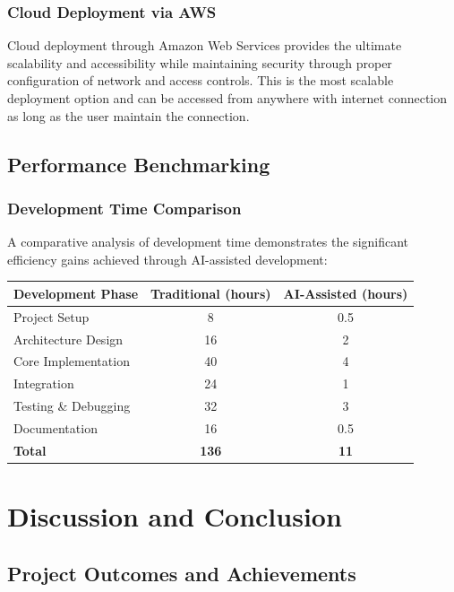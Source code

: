 \documentclass[12pt,letterpaper]{article}
\begin{document}
\subsubsection{Cloud Deployment via AWS}

Cloud deployment through Amazon Web Services provides the ultimate scalability and accessibility while maintaining security through proper configuration of network and access controls.
This is the most scalable deployment option and can be accessed from anywhere with internet connection as long as the user maintain the connection.

\subsection{Performance Benchmarking}

\subsubsection{Development Time Comparison}

A comparative analysis of development time demonstrates the significant efficiency gains achieved through AI-assisted development:

\begin{center}
\begin{tabular}{|l|c|c|}
\hline
\textbf{Development Phase} & \textbf{Traditional (hours)} & \textbf{AI-Assisted (hours)} \\
\hline
Project Setup & 8 & 0.5 \\
Architecture Design & 16 & 2 \\
Core Implementation & 40 & 4 \\
Integration & 24 & 1 \\
Testing \& Debugging & 32 & 3 \\
Documentation & 16 & 0.5 \\
\hline
\textbf{Total} & \textbf{136} & \textbf{11} \\
\hline
\end{tabular}
\end{center}

\newpage

\section{Discussion and Conclusion}

\subsection{Project Outcomes and Achievements}
\end{document}
